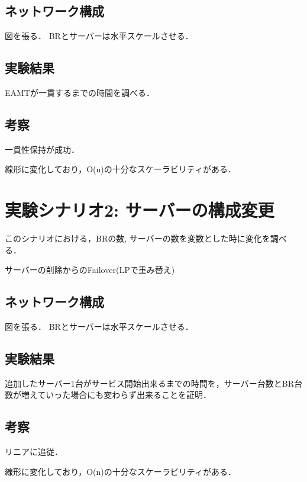 \subsection{ネットワーク構成}
図を張る． BRとサーバーは水平スケールさせる．


\subsection{実験結果}
EAMTが一貫するまでの時間を調べる．

\subsection{考察}
一貫性保持が成功．

線形に変化しており，O(n)の十分なスケーラビリティがある．


\section{実験シナリオ2: サーバーの構成変更}
このシナリオにおける，BRの数, サーバーの数を変数とした時に変化を調べる．

サーバーの削除からのFailover(LPで重み替え)



\subsection{ネットワーク構成}
図を張る． BRとサーバーは水平スケールさせる．

\subsection{実験結果}
追加したサーバー1台がサービス開始出来るまでの時間を，サーバー台数とBR台数が増えていった場合にも変わらず出来ることを証明．


\subsection{考察}
リニアに追従．

線形に変化しており，O(n)の十分なスケーラビリティがある．



